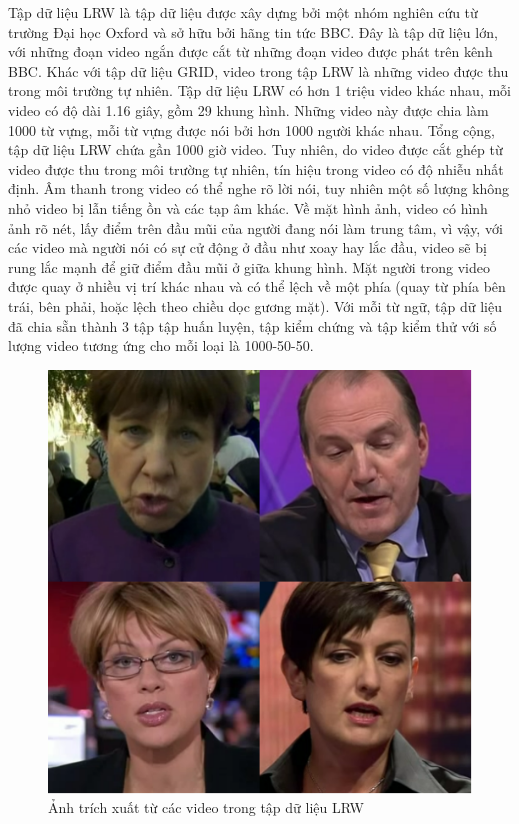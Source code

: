 Tập dữ liệu LRW là tập dữ liệu được xây dựng bởi một nhóm nghiên cứu từ trường Đại học Oxford và sở hữu bởi hãng tin tức BBC. Đây là tập dữ liệu lớn, với những đoạn video ngắn được cắt từ những đoạn video được phát trên kênh BBC. Khác với tập dữ liệu GRID, video trong tập LRW là những video được thu trong môi trường tự nhiên. Tập dữ liệu LRW có hơn 1 triệu video khác nhau, mỗi video có độ dài 1.16 giây, gồm 29 khung hình. Những video này được chia làm 1000 từ vựng, mỗi từ vựng được nói bởi hơn 1000 người khác nhau. Tổng cộng, tập dữ liệu LRW chứa gần 1000 giờ video. Tuy nhiên, do video được cắt ghép từ video được thu trong môi trường tự nhiên, tín hiệu trong video có độ nhiễu nhất định. Âm thanh trong video có thể nghe rõ lời nói, tuy nhiên một số lượng không nhỏ video bị lẫn tiếng ồn và các tạp âm khác. Về mặt hình ảnh, video có hình ảnh rõ nét, lấy điểm trên đầu mũi của người đang nói làm trung tâm, vì vậy, với các video mà người nói có sự cử động ở đầu như xoay hay lắc đầu, video sẽ bị rung lắc mạnh để giữ điểm đầu mũi ở giữa khung hình. Mặt người trong video được quay ở nhiều vị trí khác nhau và có thể lệch về một phía (quay từ phía bên trái, bên phải, hoặc lệch theo chiều dọc gương mặt). Với mỗi từ ngữ, tập dữ liệu đã chia sẵn thành 3 tập tập huấn luyện, tập kiểm chứng và tập kiểm thử với số lượng video tương ứng cho mỗi loại là 1000-50-50.

\begin{figure}[H]
    \centering
    \includegraphics[width=12cm]{./content/materials/lrw.png}
    \caption{Ảnh trích xuất từ các video trong tập dữ liệu LRW}
\end{figure}

